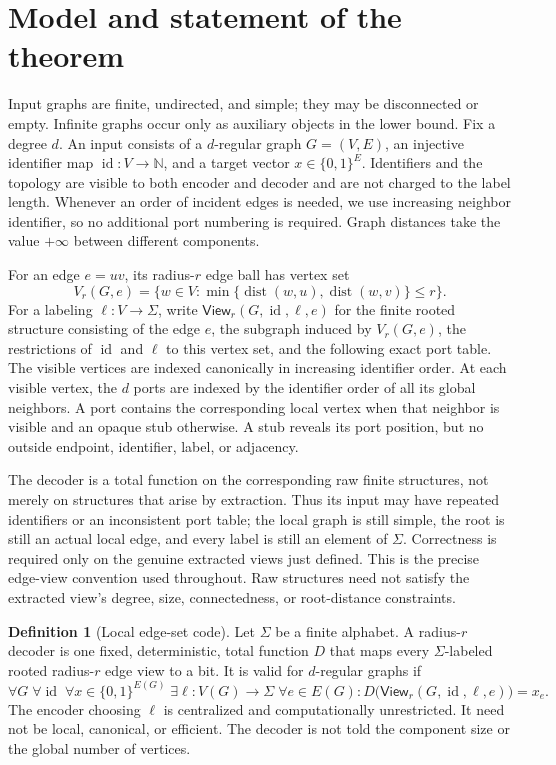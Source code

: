 \documentclass[11pt]{article}
\theoremstyle{definition}
\newtheorem{definition}[theorem]{Definition}
\theoremstyle{remark}
\newcommand{\bits}{\{0,1\}}
\newcommand{\id}{\operatorname{id}}
\newcommand{\dist}{\operatorname{dist}}
\newcommand{\N}{\mathbb N}
\begin{document}
\section{Model and statement of the theorem}
\label{sec:model}

Input graphs are finite, undirected, and simple; they may be disconnected
or empty.  Infinite graphs occur only as auxiliary objects in the lower
bound.  Fix a degree $d$.  An input consists of a $d$-regular graph
$G=(V,E)$, an injective identifier map $\id:V\to\N$, and a target vector
$x\in\bits^E$.  Identifiers and the topology are visible to both encoder and
decoder and are not charged to the label length.  Whenever an order of
incident edges is needed, we use increasing neighbor identifier, so no
additional port numbering is required.
Graph distances take the value $+\infty$ between different components.

For an edge $e=uv$, its radius-$r$ edge ball has vertex set
\[
 V_r(G,e)=\{w\in V:\min\{\dist(w,u),\dist(w,v)\}\le r\}.
\]
For a labeling $\ell:V\to\Sigma$, write
$\mathsf{View}_r(G,\id,\ell,e)$ for the finite rooted structure consisting of
the edge $e$, the subgraph induced by $V_r(G,e)$, the restrictions of $\id$
and $\ell$ to this vertex set, and the following exact port table.  The
visible vertices are indexed canonically in increasing identifier order.  At
each visible vertex, the $d$ ports are indexed by the identifier order of all
its global neighbors.  A port contains the corresponding local vertex when
that neighbor is visible and an opaque stub otherwise.  A stub reveals its
port position, but no outside endpoint, identifier, label, or adjacency.

The decoder is a total function on the corresponding raw finite structures,
not merely on structures that arise by extraction.  Thus its input may have
repeated identifiers or an inconsistent port table; the local graph is still
simple, the root is still an actual local edge, and every label is still an
element of $\Sigma$.  Correctness is required only on the genuine extracted
views just defined.  This is the precise edge-view convention used throughout.
Raw structures need not satisfy the extracted view's degree, size,
connectedness, or root-distance constraints.

\begin{definition}[Local edge-set code]
Let $\Sigma$ be a finite alphabet.  A radius-$r$ decoder is one fixed,
deterministic, total function $D$ that maps every $\Sigma$-labeled rooted
radius-$r$ edge view to a bit.  It is valid for $d$-regular graphs if
\[
 \forall G\;\forall\id\;\forall x\in\bits^{E(G)}\;
 \exists\ell:V(G)\to\Sigma\;\forall e\in E(G):
 D\bigl(\mathsf{View}_r(G,\id,\ell,e)\bigr)=x_e.              \tag{2.1}
\]
The encoder choosing $\ell$ is centralized and computationally unrestricted.
It need not be local, canonical, or efficient.  The decoder is not told the
component size or the global number of vertices.
\end{definition}
\end{document}

